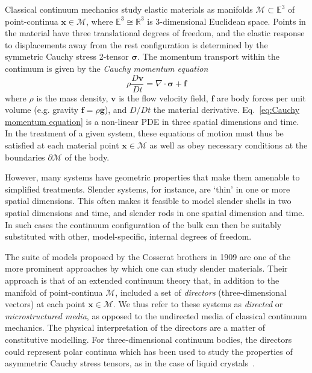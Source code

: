 Classical continuum mechanics study elastic materials as manifolds $\mathcal{M} \subset \mathbb{E}^3$ of point-continua $\mathbf{x} \in \mathcal{M}$, where $\mathbb{E}^3 \cong \mathbb{R}^3$ is 3-dimensional Euclidean space. Points in the material have three translational degrees of freedom, and the elastic response to displacements away from the rest configuration is determined by the symmetric Cauchy stress 2-tensor $\boldsymbol{\sigma}$. The momentum transport within the continuum is given by the \textit{Cauchy momentum equation}
\begin{equation} \label{eq:Cauchy momentum equation}
\rho \frac{D \mathbf{v} }{D t} = \nabla \cdot \boldsymbol{\sigma} + \mathbf{f}
\end{equation}
where $\rho$ is the mass density, $\mathbf{v}$ is the flow velocity field, $\mathbf{f}$ are body forces per unit volume (e.g. gravity $\mathbf{f} = \rho \mathbf{g}$), and $D/Dt$ the material derivative. Eq.~\eqref{eq:Cauchy momentum equation} is a non-linear PDE in three spatial dimensions and time. In the treatment of a given system, these equations of motion must thus be satisfied at each material point $\mathbf{x} \in \mathcal{M}$ as well as obey necessary conditions at the boundaries $\partial \mathcal{M}$ of the body.

However, many systems have geometric properties that make them amenable to simplified treatments. Slender systems, for instance, are `thin' in one or more spatial dimensions. This often makes it feasible to model slender shells in two spatial dimensions and time, and slender rods in one spatial dimension and time. In such cases the continuum configuration of the bulk can then be suitably substituted with other, model-specific, internal degrees of freedom.

The suite of models proposed by the Cosserat brothers \citep{cosseratTheoryDeformableBodies1909} in 1909 are one of the more prominent approaches by which one can study slender materials. Their approach is that of an extended continuum theory that, in addition to the manifold of point-continua $\mathcal{M}$, included a set of \textit{directors} (three-dimensional vectors) at each point $\mathbf{x} \in \mathcal{M}$. We thus refer to these systems as \textit{directed} or \textit{microstructured media}, as opposed to the undirected media of classical continuum mechanics. The physical interpretation of the directors are a matter of constitutive modelling. For three-dimensional continuum bodies, the directors could represent polar continua which has been used to study the properties of asymmetric Cauchy stress tensors, as in the case of liquid crystals~\citep{ericksenConservationLawsLiquid1961}.

